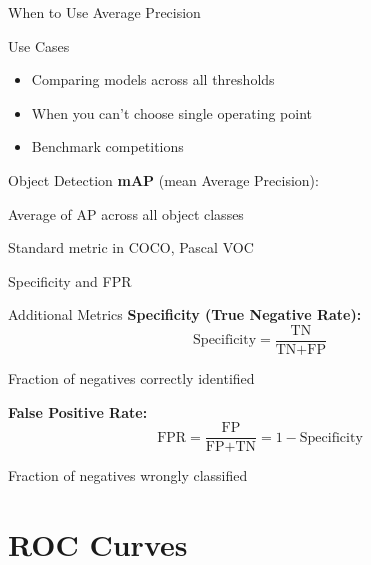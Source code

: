 \documentclass{beamer}
\begin{document}
\begin{frame}{When to Use Average Precision}
\begin{keypointsbox}{Use Cases}
\begin{itemize}
    \item Comparing models across all thresholds
    \item When you can't choose single operating point
    \item Benchmark competitions
\end{itemize}
\end{keypointsbox}

\vspace{0.3cm}

\begin{examplebox}{Object Detection}
\textbf{mAP} (mean Average Precision):

\vspace{0.2cm}

Average of AP across all object classes

\vspace{0.2cm}

Standard metric in COCO, Pascal VOC
\end{examplebox}
\end{frame}

\begin{frame}{Specificity and FPR}
\begin{definitionbox}{Additional Metrics}
\textbf{Specificity (True Negative Rate):}
$$\text{Specificity} = \frac{\text{TN}}{\text{TN} + \text{FP}}$$

Fraction of negatives correctly identified

\vspace{0.4cm}

\textbf{False Positive Rate:}
$$\text{FPR} = \frac{\text{FP}}{\text{FP} + \text{TN}} = 1 - \text{Specificity}$$

Fraction of negatives wrongly classified
\end{definitionbox}
\end{frame}

\section{ROC Curves}
\end{document}
